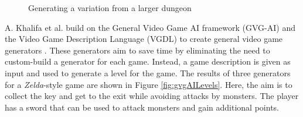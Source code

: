 \begin{figure}[H]
    \centering
    \hfill
    \caption{Generating a variation from a larger dungeon \cite{Graph_Constraint_Dungeon}}
    \label{fig:graphDungeon}
\end{figure}

A. Khalifa et al. build on the General Video Game AI framework (GVG-AI) and the Video Game Description Language (VGDL) to create general video game generators \cite{GVG-AI_and_VGDL_Level_Generators}. These generators aim to save time by eliminating the need to custom-build a generator for each game. Instead, a game description is given as input and used to generate a level for the game. The results of three generators for a \textit{Zelda}-style game are shown in Figure \ref{fig:gvgAILevels}. Here, the aim is to collect the key and get to the exit while avoiding attacks by monsters. The player has a sword that can be used to attack monsters and gain additional points.

